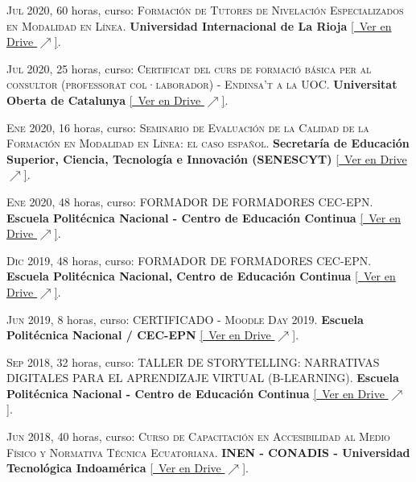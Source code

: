 \documentclass[a4paper]{article}
\begin{document}
\textsc{Jul} 2020, 60 horas, curso: \textsc{Formación de Tutores de Nivelación Especializados en Modalidad en Línea}.
\textbf{Universidad Internacional de La Rioja} \small \href{https://drive.google.com/file/d/1QyqilQpAHwRO2eW_grC2SZxYhrx10XZ4/view}{[\faGoogleDrive~Ver en Drive $\nearrow$]}.

\textsc{Jul} 2020, 25 horas, curso: \textsc{Certificat del curs de formació básica per al consultor (professorat col·laborador) - Endinsa't a la UOC}.
\textbf{Universitat Oberta de Catalunya} \small \href{https://drive.google.com/file/d/1OH8nQyEi8vbOjo1QINlTGJnTgG76l-En/view}{[\faGoogleDrive~Ver en Drive $\nearrow$]}.

\textsc{Ene} 2020, 16 horas, curso: \textsc{Seminario de Evaluación de la Calidad de la Formación en Modalidad en Línea: el caso español}.
\textbf{Secretaría de Educación Superior, Ciencia, Tecnología e Innovación (SENESCYT)} \small \href{https://drive.google.com/file/d/1OKysORQQfeZGgVp-r2Q0m6cD_h-VMM8d/view}{[\faGoogleDrive~Ver en Drive $\nearrow$]}.

\textsc{Ene} 2020, 48 horas, curso: \textsc{FORMADOR DE FORMADORES CEC-EPN}.
\textbf{Escuela Politécnica Nacional - Centro de Educación Continua} \small \href{https://drive.google.com/file/d/15OWp8VxR4D6d0wrSYgk5oL7uygfTXkm6/view}{[\faGoogleDrive~Ver en Drive $\nearrow$]}.

\textsc{Dic} 2019, 48 horas, curso: \textsc{FORMADOR DE FORMADORES CEC-EPN}.
\textbf{Escuela Politécnica Nacional, Centro de Educación Continua} \small \href{https://drive.google.com/file/d/1PjsYpdE_ArpH37YeYm9ZS3slEbCiDQq0/view}{[\faGoogleDrive~Ver en Drive $\nearrow$]}.

\textsc{Jun} 2019, 8 horas, curso: \textsc{CERTIFICADO - Moodle Day 2019}.
\textbf{Escuela Politécnica Nacional / CEC-EPN} \small \href{https://drive.google.com/file/d/1fzpEeHKKIMfQH6_kPtF0s1YgbXXgIiZO/view}{[\faGoogleDrive~Ver en Drive $\nearrow$]}.

\textsc{Sep} 2018, 32 horas, curso: \textsc{TALLER DE STORYTELLING: NARRATIVAS DIGITALES PARA EL APRENDIZAJE VIRTUAL (B-LEARNING)}.
\textbf{Escuela Politécnica Nacional - Centro de Educación Continua} \small \href{https://drive.google.com/file/d/1I2-ZWcLWD3DbLuSnHD4jENhzJpb6lza_/view}{[\faGoogleDrive~Ver en Drive $\nearrow$]}.

\textsc{Jun} 2018, 40 horas, curso: \textsc{Curso de Capacitación en Accesibilidad al Medio Físico y Normativa Técnica Ecuatoriana}.
\textbf{INEN - CONADIS - Universidad Tecnológica Indoamérica} \small \href{https://drive.google.com/file/d/1D2SVpfzCm1Gv_StM6fcs99CHKhgJeBBx/view}{[\faGoogleDrive~Ver en Drive $\nearrow$]}.
\end{document}
